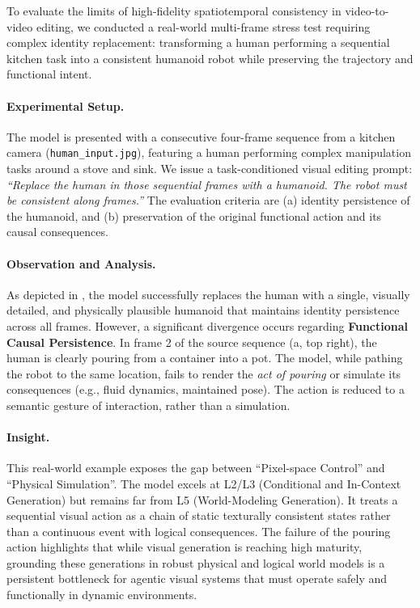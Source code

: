 \documentclass{llmxive}
\begin{document}
To evaluate the limits of high-fidelity spatiotemporal consistency in video-to-video editing, we conducted a real-world multi-frame stress test requiring complex identity replacement: transforming a human performing a sequential kitchen task into a consistent humanoid robot while preserving the trajectory and functional intent.

\paragraph{Experimental Setup.}
The model is presented with a consecutive four-frame sequence from a kitchen camera (\texttt{human\_input.jpg}), featuring a human performing complex manipulation tasks around a stove and sink. We issue a task-conditioned visual editing prompt: \textit{``Replace the human in those sequential frames with a humanoid. The robot must be consistent along frames.''} The evaluation criteria are (a) identity persistence of the humanoid, and (b) preservation of the original functional action and its causal consequences.


\paragraph{Observation and Analysis.}
As depicted in , the model successfully replaces the human with a single, visually detailed, and physically plausible humanoid that maintains identity persistence across all frames. However, a significant divergence occurs regarding \textbf{Functional Causal Persistence}. In frame 2 of the source sequence (a, top right), the human is clearly pouring from a container into a pot. The model, while pathing the robot to the same location, fails to render the \textit{act of pouring} or simulate its consequences (e.g., fluid dynamics, maintained pose). The action is reduced to a semantic gesture of interaction, rather than a simulation.

\paragraph{Insight.}
This real-world example exposes the gap between ``Pixel-space Control'' and ``Physical Simulation''. The model excels at L2/L3 (Conditional and In-Context Generation) but remains far from L5 (World-Modeling Generation). It treats a sequential visual action as a chain of static texturally consistent states rather than a continuous event with logical consequences. The failure of the pouring action highlights that while visual generation is reaching high maturity, grounding these generations in robust physical and logical world models is a persistent bottleneck for agentic visual systems that must operate safely and functionally in dynamic environments.
\end{document}
